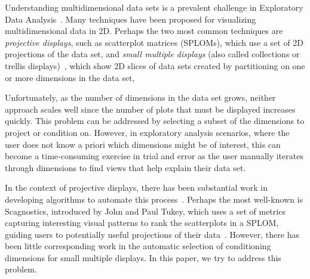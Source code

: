 

Understanding multidimensional data sets is a prevalent challenge in Exploratory Data Analysis~\cite{Tukey1977}. Many techniques have been proposed for visualizing multidimensional data in 2D. Perhaps the two most common techniques are
\emph{projective displays}, such as scatterplot matrices (SPLOMs), which use a set of 2D projections of the data set,
and \emph{small multiple displays} (also called collections or trellis displays)~\cite{Bertin1983, tufte1986, Becker1996}, which show 2D slices of data sets created by partitioning on one or more dimensions in the data set,

Unfortunately, as the number of dimensions in the data set grows, neither approach scales well since the number of plots that must be displayed increases quickly. This problem can be addressed by selecting a subset of the dimensions to project or condition on. However, in exploratory analysis scenarios, where the user does not know a priori which dimensions might be of interest, this can become a time-consuming exercise in trial and error as the user manually iterates through dimensions to find views that help explain their data set. 

In the context of projective displays, there has been substantial work in developing algorithms to automate this process~\cite{Seo2005,Wilkinson2005,Sips2009}.
Perhaps the most well-known is Scagnostics, introduced by John and Paul Tukey, which uses a set of metrics capturing interesting visual patterns to rank the scatterplots in a SPLOM, guiding users to potentially useful projections of their data~\cite{}.
However, there has been little corresponding work in the automatic selection of conditioning dimensions for small multiple displays. In this paper, we try to address this problem.

